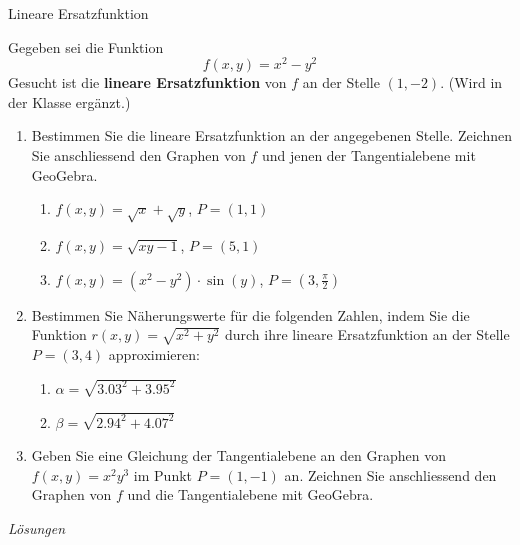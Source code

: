 \begin{bsp}
	{Lineare Ersatzfunktion}{}


	Gegeben sei die Funktion
	\[
		f(x, y) = x^2 - y^2
	\]
	Gesucht ist die \textbf{lineare Ersatzfunktion} von \( f \) an der Stelle \( (1, -2) \). (Wird in der Klasse ergänzt.)




	\vspace*{8cm}
\end{bsp}

\begin{ueb}
	{}{}

	\begin{enumerate}
		\item Bestimmen Sie die lineare Ersatzfunktion an der angegebenen Stelle.
		      Zeichnen Sie anschliessend den Graphen von \( f \) und jenen der Tangentialebene mit GeoGebra.
		      \begin{enumerate}
			      \item \( f(x, y) = \sqrt{x} + \sqrt{y} \), \quad \( P = (1, 1) \)
			      \item \( f(x, y) = \sqrt{xy - 1} \), \quad \( P = (5, 1) \)
			      \item \( f(x, y) = (x^2 - y^2) \cdot \sin(y) \), \quad \( P = (3, \frac{\pi}{2}) \)
		      \end{enumerate}

		\item Bestimmen Sie Näherungswerte für die folgenden Zahlen,
		      indem Sie die Funktion \( r(x, y) = \sqrt{x^2 + y^2} \) durch ihre lineare Ersatzfunktion an der Stelle \( P = (3, 4) \) approximieren:
		      \begin{enumerate}
			      \item \( \alpha = \sqrt{3.03^2 + 3.95^2} \)
			      \item \( \beta = \sqrt{2.94^2 + 4.07^2} \)
		      \end{enumerate}

		\item Geben Sie eine Gleichung der Tangentialebene an den Graphen von
		      \( f(x, y) = x^2 y^3 \) im Punkt \( P = (1 , -1) \) an.
		      Zeichnen Sie anschliessend den Graphen von \( f \) und die Tangentialebene mit GeoGebra.

	\end{enumerate}

\end{ueb}
\pagebreak
\emph{Lösungen}

